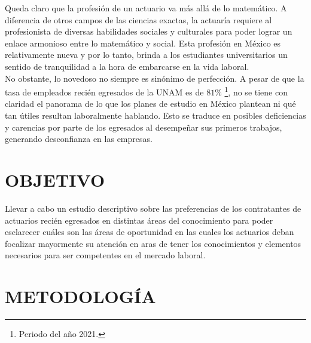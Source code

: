 \documentclass{article}
\begin{document}
Queda claro que la profesión de un actuario va más allá de lo matemático. A diferencia de otros campos de las ciencias exactas, la actuaría requiere al profesionista de diversas habilidades sociales y culturales para poder lograr un enlace armonioso entre lo matemático y social. Esta profesión en México es relativamente nueva y por lo tanto, brinda a los estudiantes universitarios un sentido de tranquilidad a la hora de embarcarse en la vida laboral. \\

No obstante, lo novedoso no siempre es sinónimo de perfección. A pesar de que la tasa de empleados recién egresados de la UNAM es de $81\%$ \footnote{Periodo del año 2021.}, no se tiene con claridad el panorama de lo que los planes de estudio en México plantean ni qué tan útiles resultan laboralmente hablando. Esto se traduce en posibles deficiencias y carencias por parte de los egresados al desempeñar sus primeros trabajos, generando desconfianza en las empresas.
 
\section{OBJETIVO}

Llevar a cabo un estudio descriptivo sobre las preferencias de los contratantes de actuarios recién egresados en distintas áreas del conocimiento para poder esclarecer cuáles son las áreas de oportunidad en las cuales los actuarios deban focalizar mayormente su atención en aras de tener los conocimientos y elementos necesarios para ser competentes en el mercado laboral.  

\section{METODOLOGÍA}
\end{document}
